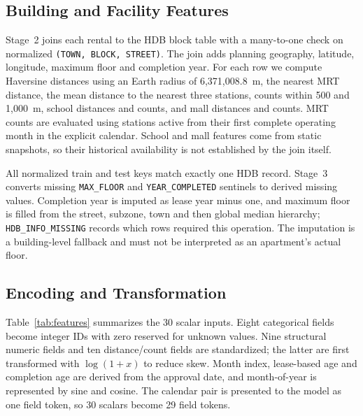 \subsection{Building and Facility Features}
Stage~2 joins each rental to the HDB block table with a many-to-one check on normalized \texttt{(TOWN, BLOCK, STREET)}.  The join adds planning geography, latitude, longitude, maximum floor and completion year.  For each row we compute Haversine distances using an Earth radius of 6,371,008.8~m, the nearest MRT distance, the mean distance to the nearest three stations, counts within 500 and 1,000~m, school distances and counts, and mall distances and counts.  MRT counts are evaluated using stations active from their first complete operating month in the explicit calendar.  School and mall features come from static snapshots, so their historical availability is not established by the join itself.

All normalized train and test keys match exactly one HDB record.  Stage~3 converts missing \texttt{MAX\_FLOOR} and \texttt{YEAR\_COMPLETED} sentinels to derived missing values.  Completion year is imputed as lease year minus one, and maximum floor is filled from the street, subzone, town and then global median hierarchy; \texttt{HDB\_INFO\_MISSING} records which rows required this operation.  The imputation is a building-level fallback and must not be interpreted as an apartment's actual floor.

\subsection{Encoding and Transformation}
Table~\ref{tab:features} summarizes the 30 scalar inputs.  Eight categorical fields become integer IDs with zero reserved for unknown values.  Nine structural numeric fields and ten distance/count fields are standardized; the latter are first transformed with $\log(1+x)$ to reduce skew.  Month index, lease-based age and completion age are derived from the approval date, and month-of-year is represented by sine and cosine.  The calendar pair is presented to the model as one field token, so 30 scalars become 29 field tokens.

